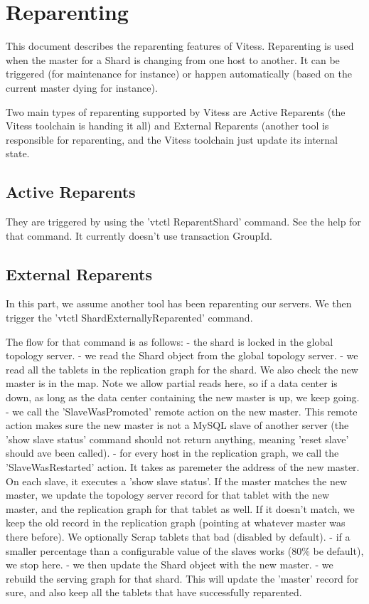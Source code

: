 \section{Reparenting}\hypertarget{reparenting}{}\label{reparenting}

This document describes the reparenting features of Vitess. Reparenting is used when the master for a Shard is
changing from one host to another. It can be triggered (for maintenance for instance) or happen automatically
(based on the current master dying for instance).

Two main types of reparenting supported by Vitess are Active Reparents (the Vitess toolchain is handing it all)
and External Reparents (another tool is responsible for reparenting, and the Vitess toolchain just update its
internal state.

\subsection{Active Reparents}\hypertarget{active-reparents}{}\label{active-reparents}

They are triggered by using the 'vtctl ReparentShard' command. See the help for that command. It currently doesn't use transaction GroupId.

\subsection{External Reparents}\hypertarget{external-reparents}{}\label{external-reparents}

In this part, we assume another tool has been reparenting our servers. We then trigger the
'vtctl ShardExternallyReparented' command.

The flow for that command is as follows:
- the shard is locked in the global topology server.
- we read the Shard object from the global topology server.
- we read all the tablets in the replication graph for the shard. We also check the new master is in the map. Note we allow partial reads here, so if a data center is down, as long as the data center containing the new master is up, we keep going.
- we call the 'SlaveWasPromoted' remote action on the new master. This remote action makes sure the new master is not a MySQL slave of another server (the 'show slave status' command should not return anything, meaning 'reset slave' should ave been called).
- for every host in the replication graph, we call the 'SlaveWasRestarted' action. It takes as paremeter the address of the new master. On each slave, it executes a 'show slave status'. If the master matches the new master, we update the topology server record for that tablet with the new master, and the replication graph for that tablet as well. If it doesn't match, we keep the old record in the replication graph (pointing at whatever master was there before). We optionally Scrap tablets that bad (disabled by default).
- if a smaller percentage than a configurable value of the slaves works (80\% be default), we stop here.
- we then update the Shard object with the new master.
- we rebuild the serving graph for that shard. This will update the 'master' record for sure, and also keep all the tablets that have successfully reparented.


